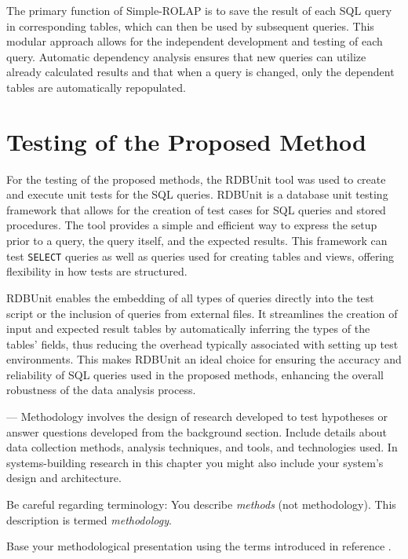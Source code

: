 The primary function of Simple-ROLAP is to save the result of each SQL query in
corresponding tables, which can then be used by subsequent queries. This
modular approach allows for the independent development and testing of each
query. Automatic dependency analysis ensures that new queries can utilize
already calculated results and that when a query is changed, only the dependent
tables are automatically repopulated.

\section{Testing of the Proposed Method}
For the testing of the proposed methods, the RDBUnit \cite{rdbunit} tool was
used to create and execute unit tests for the SQL queries. RDBUnit is a
database unit testing framework that allows for the creation of test cases for
SQL queries and stored procedures. The tool provides a simple and efficient way
to express the setup prior to a query, the query itself, and the expected
results. This framework can test \texttt{SELECT} queries as well as queries used for
creating tables and views, offering flexibility in how tests are structured.

RDBUnit enables the embedding of all types of queries directly into the test
script or the inclusion of queries from external files. It streamlines the
creation of input and expected result tables by automatically inferring the
types of the tables' fields, thus reducing the overhead typically associated
with setting up test environments. This makes RDBUnit an ideal choice for
ensuring the accuracy and reliability of SQL queries used in the proposed
methods, enhancing the overall robustness of the data analysis process.





--- Methodology involves the design of research developed to test
hypotheses or answer questions developed from the background section. Include
details about data collection methods, analysis techniques, and tools, and
technologies used. In systems-building research in this chapter you might also
include your system's design and architecture.

Be careful regarding terminology: You describe \emph{methods} (not
methodology). This description is termed \emph{methodology}.

Base your methodological presentation using the terms introduced in reference
\cite{SF18}.

